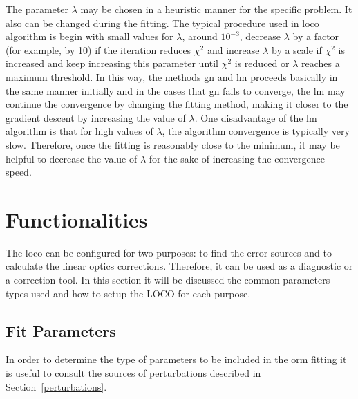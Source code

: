 The parameter $\lambda$ may be chosen in a heuristic manner for the specific problem. It also can be changed during the fitting. The typical procedure used in \gls{loco} algorithm \cite{icfa_huang, huang2019beam} is begin with small values for $\lambda$, around $10^{-3}$, decrease $\lambda$ by a factor (for example, by 10) if the iteration reduces $\chi^2$ and increase $\lambda$ by a scale if $\chi^2$ is increased and keep increasing this parameter until $\chi^2$ is reduced or $\lambda$ reaches a maximum threshold. In this way, the methods \gls{gn} and \gls{lm} proceeds basically in the same manner initially and in the cases that \gls{gn} fails to converge, the \gls{lm} may continue the convergence by changing the fitting method, making it closer to the gradient descent by increasing the value of $\lambda$. One disadvantage of the \gls{lm} algorithm is that for high values of $\lambda$, the algorithm convergence is typically very slow. Therefore, once the fitting is reasonably close to the minimum, it may be helpful to decrease the value of $\lambda$ for the sake of increasing the convergence speed.
\section{Functionalities}
The \gls{loco} can be configured for two purposes: to find the error sources and to calculate the linear optics corrections. Therefore, it can be used as a diagnostic or a correction tool. In this section it will be discussed the common parameters types used and how to setup the LOCO for each purpose.
\subsection{Fit Parameters}\label{subsec:fit_params}
In order to determine the type of parameters to be included in the \gls{orm} fitting it is useful to consult the sources of perturbations described in Section~\ref{perturbations}.

